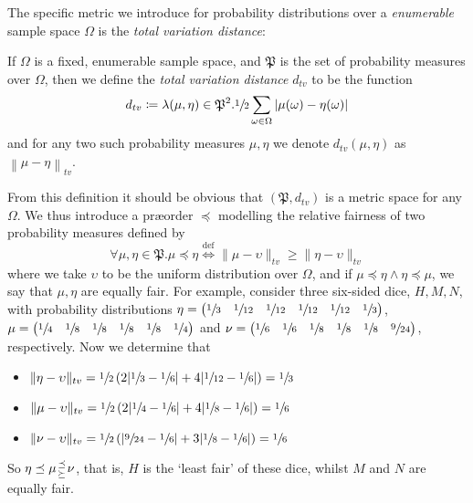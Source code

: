 	The specific metric we introduce for probability distributions over a \emph{enumerable} sample
	space $\Omega$ is the \emph{total variation distance}:
	\begin{definition}
		If $\Omega$ is a fixed, enumerable sample space, and $\mathfrak{P}$ is the set of 
		probability measures over $\Omega$, then we define the \emph{total variation distance}
		$d_{tv}$ to be the function
		$$
			d_{tv} \coloneqq \lambda (\mu, \eta) \in \mathfrak{P}^2 . \sfrac{1}{2} 
			\sum_{\omega \in \Omega} | \mu(\omega) - \eta(\omega) |
		$$
		and for any two such probability measures $\mu, \eta$ we denote $d_{tv}(\mu, \eta)$ as
		$\left\| \mu - \eta \right\|_{tv}$.
	\end{definition}
	From this definition it should be obvious that $(\mathfrak{P}, d_{tv})$ is a metric space for 
	any $\Omega$. We thus introduce a præorder $\preceq$ modelling the relative fairness of
	two probability measures defined by 
	$$
		\forall \mu, \eta \in \mathfrak{P}. 
		\mu \preceq \eta \stackrel{\mathrm{def}}{\iff} \|\mu - \upsilon\|_{tv} \geq 
		\|\eta - \upsilon\|_{tv}
	$$
	where we take $\upsilon$ to be the uniform distribution over $\Omega$, and if $\mu \preceq 
	\eta \land \eta \preceq \mu$, we say that $\mu, \eta$ are equally fair. For example, consider
	three six-sided dice, $H, M, N$, with probability distributions $\eta = \begin{pmatrix} 
	\sfrac{1}{3} & \sfrac{1}{12} & \sfrac{1}{12} &\sfrac{1}{12} &\sfrac{1}{12} & \sfrac{1}{3}
	\end{pmatrix}$, $\mu = \begin{pmatrix} \sfrac{1}{4} & \sfrac{1}{8} & \sfrac{1}{8} & 
	\sfrac{1}{8} & \sfrac{1}{8} & \sfrac{1}{4}\end{pmatrix}$ and $\nu = \begin{pmatrix} 
	\sfrac{1}{6} & \sfrac{1}{6} & \sfrac{1}{8} & \sfrac{1}{8} & \sfrac{1}{8} & \sfrac{9}{24}
	\end{pmatrix}$, respectively. Now we determine that
	\begin{itemize}
		\item $\|\eta - \upsilon\|_{tv} = \sfrac{1}{2} \left(2|\sfrac{1}{3} - \sfrac{1}{6}| + 
		4|\sfrac{1}{12}-\sfrac{1}{6}|\right) = \sfrac{1}{3}$
		\item $\|\mu - \upsilon\|_{tv} = \sfrac{1}{2} \left(2|\sfrac{1}{4} - \sfrac{1}{6}| + 
		4|\sfrac{1}{8}-\sfrac{1}{6}|\right) = \sfrac{1}{6}$
		\item $\|\nu - \upsilon\|_{tv} = \sfrac{1}{2} \left(|\sfrac{9}{24} - \sfrac{1}{6}| + 
		3|\sfrac{1}{8}-\sfrac{1}{6}|\right) = \sfrac{1}{6}$
	\end{itemize}
	So $\eta \preceq \mu \genfrac{}{}{0pt}{}{\preceq}{\succeq} \nu$, that is, $H$ is the `least 
	fair' of these dice, whilst $M$ and $N$ are equally fair.

